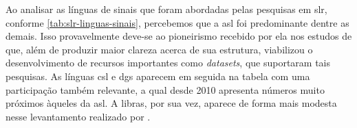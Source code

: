 % 





Ao analisar as línguas de sinais que foram abordadas pelas pesquisas em \acrshort{slr}, conforme \autoref{tab:slr-linguas-sinais}, percebemos que a \acrshort{asl} foi predominante dentre as demais. Isso provavelmente deve-se ao pioneirismo recebido por ela nos estudos de  que, além de produzir maior clareza acerca de sua estrutura, viabilizou o desenvolvimento de recursos importantes como \textit{datasets}, que suportaram tais pesquisas.
As línguas \acrfull{csl} e \acrfull{dgs} aparecem em seguida na tabela com uma participação também relevante, a qual desde 2010 apresenta números muito próximos àqueles da \acrshort{asl}. A \acrfull{libras}, por sua vez, aparece de forma mais modesta nesse levantamento realizado por .




